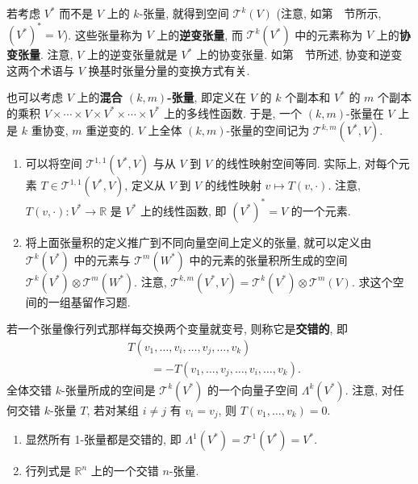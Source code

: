 若考虑 $V^*$ 而不是 $V$ 上的 $k$-张量, 就得到空间 $\mathcal{T}^k(V)$ (注意, 如第~~节所示, $(V^*)^*=V$). 这些张量称为 $V$ 上的\textbf{逆变张量}, 而 $\mathcal{T}^k(V^*)$ 中的元素称为 $V$ 上的\textbf{协变张量}. 注意, $V$ 上的逆变张量就是 $V^*$ 上的协变张量. 如第~~节所述, 协变和逆变这两个术语与 $V$ 换基时张量分量的变换方式有关.

也可以考虑 $V$ 上的\textbf{混合 $(k,m)$-张量}, 即定义在 $V$ 的 $k$ 个副本和 $V^*$ 的 $m$ 个副本的乘积
$V\times\cdots\times V\times V^*\times\cdots\times V^*$ 上的多线性函数. 于是, 一个 $(k,m)$-张量在 $V$ 上是 $k$ 重协变, $m$ 重逆变的. $V$ 上全体 $(k,m)$-张量的空间记为 $\mathcal{T}^{k,m}(V^*,V)$.

\begin{RiemannRemark}\label{rem:mixed-tensors-and-linear-maps}
\begin{enumerate}[label=(\arabic*),leftmargin=*]
\item 可以将空间 $\mathcal{T}^{1,1}(V^*,V)$ 与从 $V$ 到 $V$ 的线性映射空间等同. 实际上, 对每个元素 $T\in\mathcal{T}^{1,1}(V^*,V)$, 定义从 $V$ 到 $V$ 的线性映射 $v\mapsto T(v,\cdot)$. 注意, $T(v,\cdot):V^*\to\mathbb{R}$ 是 $V^*$ 上的线性函数, 即 $(V^*)^*=V$ 的一个元素.
\item 将上面张量积的定义推广到不同向量空间上定义的张量, 就可以定义由 $\mathcal{T}^k(V^*)$ 中的元素与 $\mathcal{T}^m(W^*)$ 中的元素的张量积所生成的空间 $\mathcal{T}^k(V^*)\otimes\mathcal{T}^m(W^*)$. 注意, $\mathcal{T}^{k,m}(V^*,V)=\mathcal{T}^k(V^*)\otimes\mathcal{T}^m(V)$. 求这个空间的一组基留作习题.
\end{enumerate}
\end{RiemannRemark}

若一个张量像行列式那样每交换两个变量就变号, 则称它是\label{idx:alternating-tensors}\textbf{交错的}, 即
\begin{align*}
  &T(v_1,\ldots,v_i,\ldots,v_j,\ldots,v_k)\\
  &\qquad=-T(v_1,\ldots,v_j,\ldots,v_i,\ldots,v_k).
\end{align*}
全体交错 $k$-张量所成的空间是 $\mathcal{T}^k(V^*)$ 的一个向量子空间 $\Lambda^k(V^*)$. 注意, 对任何交错 $k$-张量 $T$, 若对某组 $i\ne j$ 有 $v_i=v_j$, 则 $T(v_1,\ldots,v_k)=0$.

\begin{RiemannExample}\label{ex:linear-functionals-and-determinant-are-alternating}
\begin{enumerate}[label=(\arabic*),leftmargin=*]
\item 显然所有 1-张量都是交错的, 即 $\Lambda^1(V^*)=\mathcal{T}^1(V^*)=V^*$.
\item 行列式是 $\mathbb{R}^n$ 上的一个交错 $n$-张量.
\end{enumerate}
\end{RiemannExample}

